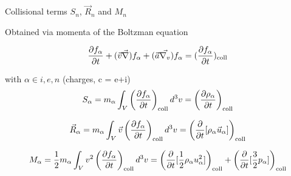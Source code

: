 \documentclass{beamer}
\begin{document}
\begin{frame}{Collisional terms $S_n$, $\vec{R}_n$ and $M_n$}

Obtained via momenta of the Boltzman equation

\begin{equation} \nonumber
\frac{\partial f_{\alpha} }{\partial t} + (\vec{v}\vec{\nabla})  f_{\alpha} + (\vec{a} \vec{\nabla_v} )f_{\alpha} = (\frac{\partial f_{\alpha}}{\partial t})_{\rm coll}
\end{equation}

with $\alpha \in {i,e,n}$ (charges, c = e+i)
%
\begin{equation} \nonumber
S_{\alpha}=m_{\alpha}\int_{V}{\left(\frac{\partial f_{\alpha}}{\partial t}\right)_{\rm coll} d^3 v} = \left( \frac{\partial \rho_{\alpha}}{\partial t} \right)_{\rm coll} 
\end{equation}

\begin{equation} \nonumber
\vec{R}_{\alpha}=m_{\alpha}\int_V{\vec{v}\left(\frac{\partial f_{\alpha}}{\partial t}\right)_{\rm coll}d^3 v} = \left( \frac{\partial}{\partial t}
[\rho_{\alpha}\vec{u}_{\alpha}] \right)_{\rm coll}
\end{equation}


\begin{equation} \nonumber
M_{\alpha}=\frac{1}{2} m_{\alpha} \int_V{v^2\left(\frac{\partial f_{\alpha}}{\partial t}\right)_{\rm coll} d^3 v} = \left( \frac{\partial }{\partial t} [\frac{1}{2}\rho_{\alpha} u_{\alpha}^2] \right)_{\rm coll}  +
\left( \frac{\partial }{\partial t} [\frac{3}{2}p_{\alpha}] \right)_{\rm coll}
\end{equation}

\end{frame}
\end{document}
